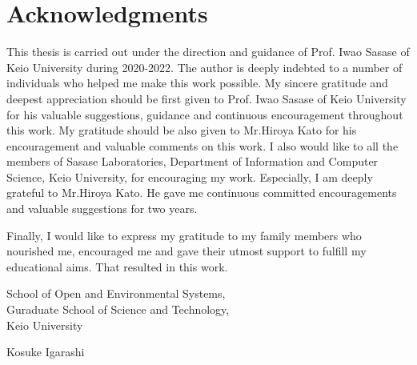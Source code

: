 \chapter*{Acknowledgments}

This thesis is carried out under the direction and guidance of Prof. Iwao Sasase of Keio University during 2020-2022.
The author is deeply indebted to a number of individuals who helped me make this work possible.  
My sincere gratitude and deepest appreciation should be first given to Prof. Iwao Sasase of Keio University for his valuable suggestions, guidance and continuous encouragement throughout this work.
My gratitude should be also given to Mr.Hiroya Kato for his encouragement and valuable comments on this work.
I also would like to all the members of Sasase Laboratories, Department of Information and Computer Science, Keio University, for encouraging my work.  
Especially, I am deeply grateful to Mr.Hiroya Kato.
He gave me continuous committed encouragements and valuable suggestions for two years.

Finally, I would like to express my gratitude to my family members who nourished me, encouraged me and gave their utmost support to fulfill my educational aims.
That resulted in this work.  
\sl
\vspace{1.5cm}
\begin{flushleft}\baselineskip=18pt
School of Open and Environmental Systems,\\ Guraduate School of Science and Technology,\\
Keio University
\end{flushleft}

\bf
\vspace{0.5cm}
\begin{flushright}
Kosuke Igarashi\\
\end{flushright}
